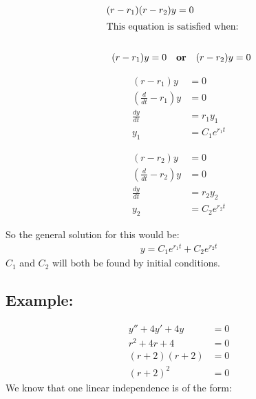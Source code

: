\documentclass[11pt]{article}
\begin{document}
\begin{align*}
    (r-r_1)(r-r_2)y&=0\\
    \intertext{This equation is satisfied when:}\\
    (r-r_1)y=0 \quad &\textbf{or} \quad (r-r_2)y=0\\
\end{align*}
\noindent
\begin{minipage}[t]{0.45\textwidth}
    
    \begin{align*}
        (r-r_1)y &= 0 \\
        (\frac{d}{dt}-r_1)y&=0\\
        \frac{dy}{dt} &= r_1 y_1 \\
        y_1 &= C_1 e^{r_1 t}
    \end{align*}
\end{minipage}%
\hfill
\begin{minipage}[t]{0.45\textwidth}
    
    \begin{align*}
        (r-r_2)y &= 0 \\
        (\frac{d}{dt}-r_2)y&=0\\
        \frac{dy}{dt} &= r_2 y_2 \\
        y_2 &= C_2 e^{r_2 t}
    \end{align*}
\end{minipage}
So the general solution for this would be:
\begin{align*}
    y=C_1e^{r_1t}+C_2e^{r_2t}
\end{align*}
$C_1$ and $C_2$ will both be found by initial conditions.
\subsection*{Example:}
\begin{align*}
    y''+4y'+4y&=0 \tag{original}\\
    r^2+4r+4&=0\\
    (r+2)(r+2)&=0\\
    (r+2)^2&=0
\end{align*}
We know that one linear independence is of the form:
\end{document}
